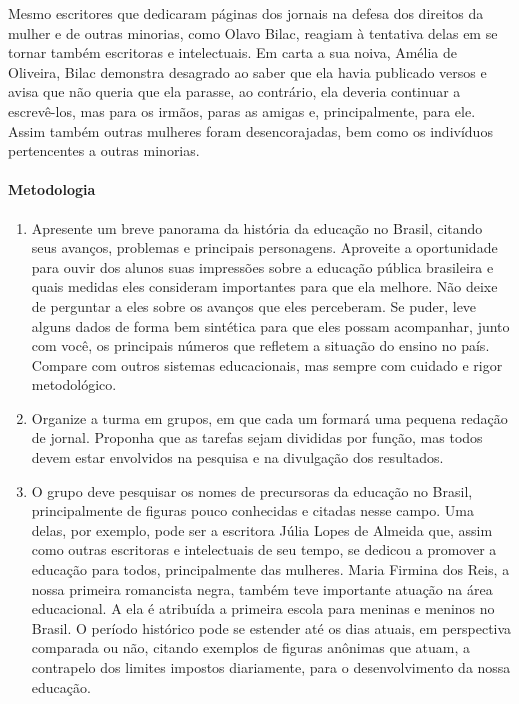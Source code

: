 \documentclass[12pt]{extarticle}
\begin{document}
Mesmo escritores que dedicaram páginas dos jornais na defesa dos
direitos da mulher e de outras minorias, como Olavo Bilac, reagiam à
tentativa delas em se tornar também escritoras e intelectuais. Em carta
a sua noiva, Amélia de Oliveira, Bilac demonstra desagrado ao saber que
ela havia publicado versos e avisa que não queria que ela parasse, ao
contrário, ela deveria continuar a escrevê-los, mas para os irmãos,
paras as amigas e, principalmente, para ele. Assim também outras
mulheres foram desencorajadas, bem como os indivíduos pertencentes a
outras minorias.

\paragraph{Metodologia}

\begin{enumerate}
\item
Apresente um breve panorama da história da
educação no Brasil, citando seus avanços, problemas e principais
personagens. Aproveite a oportunidade para ouvir dos alunos suas
impressões sobre a educação pública brasileira e quais medidas eles
consideram importantes para que ela melhore. Não deixe de perguntar a
eles sobre os avanços que eles perceberam. Se puder, leve alguns dados
de forma bem sintética para que eles possam acompanhar, junto com você,
os principais números que refletem a situação do ensino no país. Compare
com outros sistemas educacionais, mas sempre com cuidado e rigor
metodológico.

\item
Organize a turma em grupos, em que cada um formará uma pequena
redação de jornal. Proponha que as tarefas sejam divididas por função,
mas todos devem estar envolvidos na pesquisa e na divulgação dos
resultados.

\item
O grupo deve pesquisar os nomes de precursoras da educação no Brasil,
principalmente de figuras pouco conhecidas e citadas nesse campo. Uma
delas, por exemplo, pode ser a escritora Júlia Lopes de Almeida que,
assim como outras escritoras e intelectuais de seu tempo, se dedicou a
promover a educação para todos, principalmente das mulheres. Maria
Firmina dos Reis, a nossa primeira romancista negra, também teve
importante atuação na área educacional. A ela é atribuída a primeira
escola para meninas e meninos no Brasil. O período histórico pode se
estender até os dias atuais, em perspectiva comparada ou não, citando
exemplos de figuras anônimas que atuam, a contrapelo dos limites
impostos diariamente, para o desenvolvimento da nossa educação.


\end{enumerate}
\end{document}
